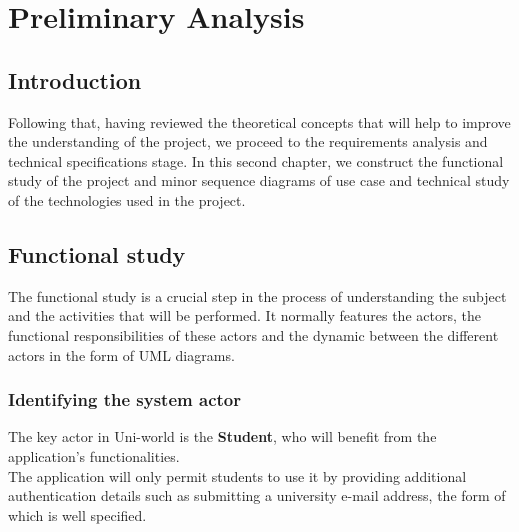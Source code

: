 \chapter{Preliminary Analysis}\label{chapter:PA}


\section*{Introduction}
Following that, having reviewed the theoretical concepts that will help to improve the understanding of the project, we proceed to the requirements analysis and technical specifications stage. In this second chapter, we construct the functional study of the project and minor sequence diagrams of use case and technical study of the technologies used in the project.

\section{Functional study}
The functional study is a crucial step in the process of understanding the subject and the activities that will be performed. It normally features the actors, the functional responsibilities of these actors and the dynamic between the different actors in the form of UML diagrams.

\subsection{Identifying the system actor}


The key actor in Uni-world is the \textbf{Student}, who will benefit from the application's functionalities. \\
The application will only permit students to use it by providing additional authentication details such as submitting a university e-mail address, the form of which is well specified.

